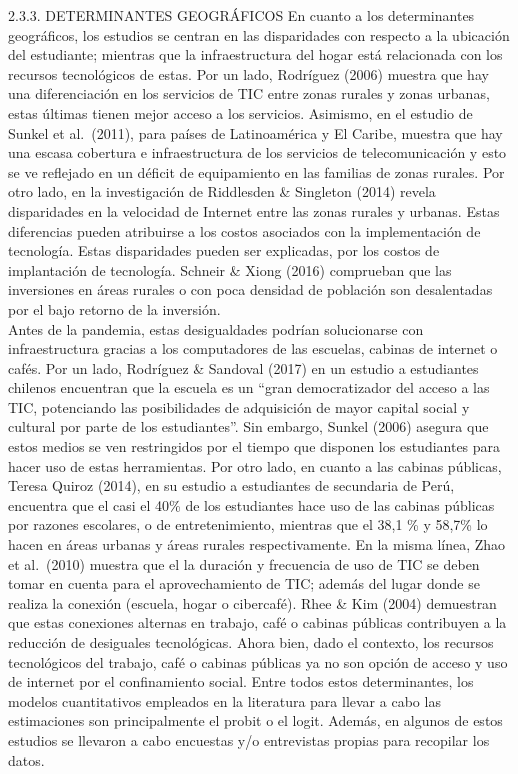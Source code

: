 2.3.3. DETERMINANTES GEOGRÁFICOS En cuanto a los determinantes
geográficos, los estudios se centran en las disparidades con respecto a
la ubicación del estudiante; mientras que la infraestructura del hogar
está relacionada con los recursos tecnológicos de estas. Por un lado,
Rodríguez (2006) muestra que hay una diferenciación en los servicios de
TIC entre zonas rurales y zonas urbanas, estas últimas tienen mejor
acceso a los servicios. Asimismo, en el estudio de Sunkel et al.~(2011),
para países de Latinoamérica y El Caribe, muestra que hay una escasa
cobertura e infraestructura de los servicios de telecomunicación y esto
se ve reflejado en un déficit de equipamiento en las familias de zonas
rurales. Por otro lado, en la investigación de Riddlesden \& Singleton
(2014) revela disparidades en la velocidad de Internet entre las zonas
rurales y urbanas. Estas diferencias pueden atribuirse a los costos
asociados con la implementación de tecnología. Estas disparidades pueden
ser explicadas, por los costos de implantación de tecnología. Schneir \&
Xiong (2016) comprueban que las inversiones en áreas rurales o con poca
densidad de población son desalentadas por el bajo retorno de la
inversión.\\
Antes de la pandemia, estas desigualdades podrían solucionarse con
infraestructura gracias a los computadores de las escuelas, cabinas de
internet o cafés. Por un lado, Rodríguez \& Sandoval (2017) en un
estudio a estudiantes chilenos encuentran que la escuela es un ``gran
democratizador del acceso a las TIC, potenciando las posibilidades de
adquisición de mayor capital social y cultural por parte de los
estudiantes''. Sin embargo, Sunkel (2006) asegura que estos medios se
ven restringidos por el tiempo que disponen los estudiantes para hacer
uso de estas herramientas. Por otro lado, en cuanto a las cabinas
públicas, Teresa Quiroz (2014), en su estudio a estudiantes de
secundaria de Perú, encuentra que el casi el 40\% de los estudiantes
hace uso de las cabinas públicas por razones escolares, o de
entretenimiento, mientras que el 38,1 \% y 58,7\% lo hacen en áreas
urbanas y áreas rurales respectivamente. En la misma línea, Zhao et
al.~(2010) muestra que el la duración y frecuencia de uso de TIC se
deben tomar en cuenta para el aprovechamiento de TIC; además del lugar
donde se realiza la conexión (escuela, hogar o cibercafé). Rhee \& Kim
(2004) demuestran que estas conexiones alternas en trabajo, café o
cabinas públicas contribuyen a la reducción de desiguales tecnológicas.
Ahora bien, dado el contexto, los recursos tecnológicos del trabajo,
café o cabinas públicas ya no son opción de acceso y uso de internet por
el confinamiento social. Entre todos estos determinantes, los modelos
cuantitativos empleados en la literatura para llevar a cabo las
estimaciones son principalmente el probit o el logit. Además, en algunos
de estos estudios se llevaron a cabo encuestas y/o entrevistas propias
para recopilar los datos.

